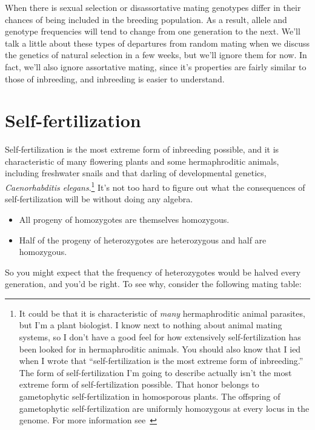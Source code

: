 When there is sexual selection or disassortative mating genotypes
differ in their chances of being included in the breeding
population. As a result, allele and genotype frequencies will tend to
change from one generation to the next. We'll talk a little about
these types of departures from random mating when we discuss the
genetics of natural selection in a few weeks, but we'll ignore them
for now. In fact, we'll also ignore assortative mating, since it's
properties are fairly similar to those of inbreeding, and inbreeding
is easier to understand.

\section*{Self-fertilization}

Self-fertilization is the most extreme form of inbreeding
possible,
and it is characteristic of many flowering plants and some
hermaphroditic animals, including freshwater snails and that darling
of developmental genetics, {\it Caenorhabditis elegans}.\footnote{It
  could be that it is characteristic of {\it many\/} hermaphroditic
  animal parasites, but I'm a plant biologist. I know next to nothing
  about animal mating systems, so I don't have a good feel for how
  extensively self-fertilization has been looked for in hermaphroditic
  animals. You should also know that I ied when I wrote that
  ``self-fertilization is the most extreme form of inbreeding.'' The
  form of self-fertilization I'm going to describe actually isn't the
  most extreme form of self-fertilization possible. That honor belongs
  to gametophytic self-fertilization in homosporous plants. The
  offspring of gametophytic self-fertilization are uniformly
  homozygous at every locus in the genome. For more information
  see~\cite{Holsinger-1990}} It's not too hard to figure out what the
consequences of self-fertilization will be without doing any algebra.

\begin{itemize}

\item All progeny of homozygotes are themselves homozygous.

\item Half of the progeny of heterozygotes are heterozygous and half
are homozygous.

\end{itemize}
So you might expect that the frequency of heterozygotes would be
halved every generation, and you'd be right. To see why, consider the
following mating table:

